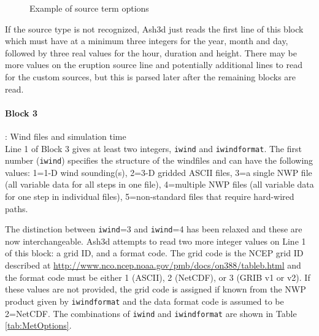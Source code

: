 \begin{figure}[htbp]
\parbox{15cm}{\caption{\label{FigSourceOptions}
Example of source term options}}
\end{figure}
If the source type is not recognized, Ash3d just reads the first line of this
block which must have at a minimum three integers for the year, month and day,
followed by three real values for the hour, duration and height.  There may
be more values on the eruption source line and potentially additional lines to
read for the custom sources, but this is parsed later after the remaining blocks
are read.

\paragraph{Block 3}: Wind files and simulation time\\
Line 1 of Block 3 gives at least two integers, \texttt{iwind} and \texttt{iwindformat}.
The first number (\texttt{iwind}) specifies the structure of the windfiles and can
have the following values:
1=1-D wind sounding(s),
2=3-D gridded ASCII files,
3=a single NWP file (all variable data for all steps in one file),
4=multiple NWP files (all variable data for one step in individual files),
5=non-standard files that require hard-wired paths.

The distinction between \texttt{iwind}=3 and \texttt{iwind}=4 has been
relaxed and these are now interchangeable.
Ash3d attempts to read two more integer values on Line 1
of this block: a grid ID, and a format code. The grid code is the NCEP grid
ID described at \url{http://www.nco.ncep.noaa.gov/pmb/docs/on388/tableb.html}
and the format code must be either 1 (ASCII), 2 (NetCDF), or 3 (GRIB v1 or v2).
If these values are not provided, the grid code is assigned if known from the
NWP product given by \texttt{iwindformat} and the data format code is assumed to
be 2=NetCDF. The combinations of \texttt{iwind} and \texttt{iwindformat} are shown in
Table \ref{tab:MetOptions}.

